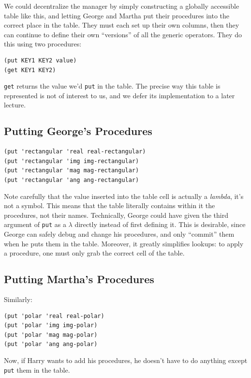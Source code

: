 \documentclass[9pt]{report}
\begin{document}
We could decentralize the manager by simply constructing a globally
accessible table like this, and letting George and Martha put their
procedures into the correct place in the table. They must each set
up their own columns, then they can continue to define their own
``versions'' of all the generic operators. They do this using two
procedures:

\begin{verbatim}
(put KEY1 KEY2 value)
(get KEY1 KEY2)
\end{verbatim}

\texttt{get} returns the value we'd \texttt{put} in the table. The precise way
this table is represented is not of interest to us, and we defer
its implementation to a later lecture.

\subsection{Putting George's Procedures}
\label{sec:org1980b95}

\begin{verbatim}
(put 'rectangular 'real real-rectangular)
(put 'rectangular 'img img-rectangular)
(put 'rectangular 'mag mag-rectangular)
(put 'rectangular 'ang ang-rectangular)
\end{verbatim}

Note carefully that the value inserted into the table cell is
actually a \emph{lambda}, it's not a symbol. This means that the table
literally contains within it the procedures, not their names.
Technically, George could have given the third argument of \texttt{put}
as a \(\lambda\) directly instead of first defining it. This is
desirable, since George can safely debug and change his
procedures, and only ``commit'' them when he puts them in the table.
Moreover, it greatly simplifies lookups: to apply a procedure, one
must only grab the correct cell of the table.


\subsection{Putting Martha's Procedures}
\label{sec:org64cd098}
Similarly:
\begin{verbatim}
(put 'polar 'real real-polar)
(put 'polar 'img img-polar)
(put 'polar 'mag mag-polar)
(put 'polar 'ang ang-polar)
\end{verbatim}

Now, if Harry wants to add his procedures, he doesn't have to do
anything except \texttt{put} them in the table.
\end{document}
